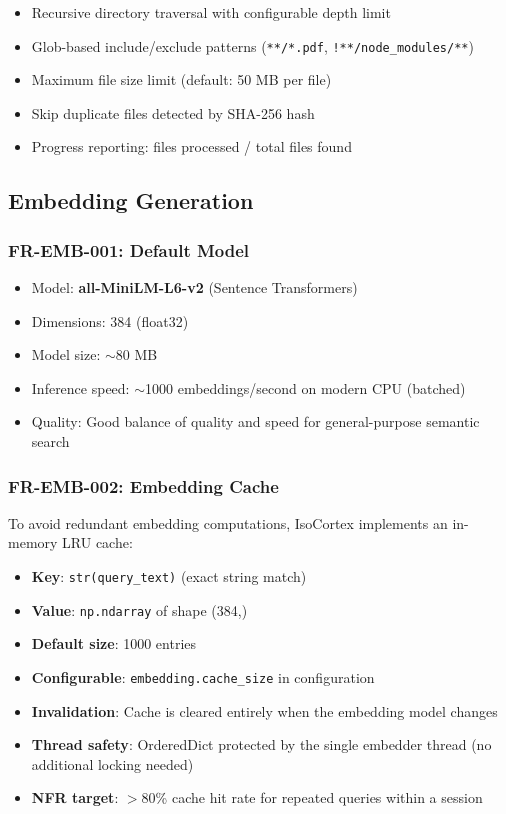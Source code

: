 \documentclass[11pt,a4paper]{article}
\newcommand{\inlinecode}[1]{\texttt{\small\colorbox{ctCodeBg}{#1}}}
\begin{document}
\begin{itemize}
    \item Recursive directory traversal with configurable depth limit
    \item Glob-based include/exclude patterns (\inlinecode{**/*.pdf}, \inlinecode{!**/node\_modules/**})
    \item Maximum file size limit (default: 50 MB per file)
    \item Skip duplicate files detected by SHA-256 hash
    \item Progress reporting: files processed / total files found
\end{itemize}

\subsection{Embedding Generation}

\subsubsection{FR-EMB-001: Default Model}

\begin{itemize}
    \item Model: \textbf{all-MiniLM-L6-v2} (Sentence Transformers)
    \item Dimensions: 384 (float32)
    \item Model size: $\sim$80 MB
    \item Inference speed: $\sim$1000 embeddings/second on modern CPU (batched)
    \item Quality: Good balance of quality and speed for general-purpose semantic search
\end{itemize}

\subsubsection{FR-EMB-002: Embedding Cache}

\begin{reqbox}
To avoid redundant embedding computations, IsoCortex implements an in-memory LRU cache:

\begin{itemize}
    \item \textbf{Key}: \inlinecode{str(query\_text)} (exact string match)
    \item \textbf{Value}: \inlinecode{np.ndarray} of shape (384,)
    \item \textbf{Default size}: 1000 entries
    \item \textbf{Configurable}: \inlinecode{embedding.cache\_size} in configuration
    \item \textbf{Invalidation}: Cache is cleared entirely when the embedding model changes
    \item \textbf{Thread safety}: OrderedDict protected by the single embedder thread (no additional locking needed)
    \item \textbf{NFR target}: $>$80\% cache hit rate for repeated queries within a session
\end{itemize}
\end{reqbox}
\end{document}
